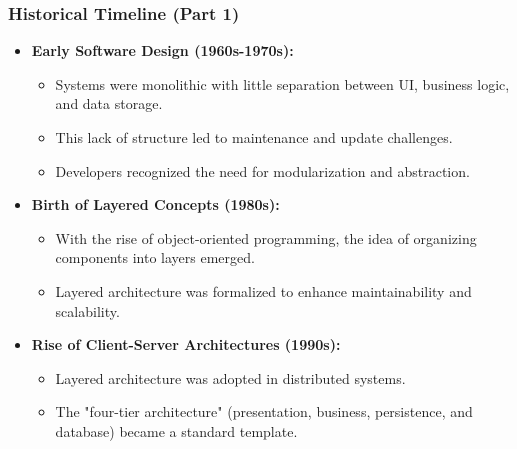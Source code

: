 \documentclass[aspectratio=169, table]{beamer}
\begin{document}
\begin{frame}
	\frametitle{Historical Timeline (Part 1)}
	\begin{itemize}
		\item \textbf{Early Software Design (1960s-1970s):}
		\begin{itemize}
			\item Systems were monolithic with little separation between UI, business logic, and data storage.
			\item This lack of structure led to maintenance and update challenges.
			\item Developers recognized the need for modularization and abstraction.
		\end{itemize}
		\item \textbf{Birth of Layered Concepts (1980s):}
		\begin{itemize}
			\item With the rise of object-oriented programming, the idea of organizing components into layers emerged.
			\item Layered architecture was formalized to enhance maintainability and scalability.
		\end{itemize}
		\item \textbf{Rise of Client-Server Architectures (1990s):}
		\begin{itemize}
			\item Layered architecture was adopted in distributed systems.
			\item The "four-tier architecture" (presentation, business, persistence, and database) became a standard template.
		\end{itemize}
	\end{itemize}
\end{frame}
\end{document}
